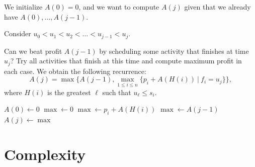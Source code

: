 \begin{frame}
We initialize $A(0)=0$,
and we want to compute $A(j)$ given that we already have
$A(0),\ldots, A(j-1)$.

Consider $u_0 < u_1 < u_2 <
\ldots < u_{j-1} < u_j $.

Can we beat profit $A(j-1)$ by scheduling some
activity that finishes at time $u_j$? Try all activities that finish
at this time and compute maximum profit in each case. We obtain the
following recurrence:
$$
A(j)=\max\{A(j-1),\max_{1\leq i\leq n}\{p_i+A(H(i))\ |\ f_i=u_j\}\},
$$
where $H(i)$ is the greatest $\ell$ such that $u_\ell\le s_i$.
\end{frame}

\begin{frame}
\begin{center}
\begin{minipage}{8cm}
\end{minipage}
\end{center}
\end{frame}

\begin{frame}
\begin{algorithmic}
\STATE $A(0)\longleftarrow 0$
	\STATE $\max\longleftarrow 0$
				\STATE $\max\longleftarrow p_i+A(H(i))$
			\ENDIF
		\ENDIF
	\ENDFOR
		\STATE $\max\longleftarrow A(j-1)$
	\ENDIF
	\STATE $A(j)\longleftarrow\max$
\ENDFOR
\end{algorithmic}
\end{frame}

\section{Complexity}

